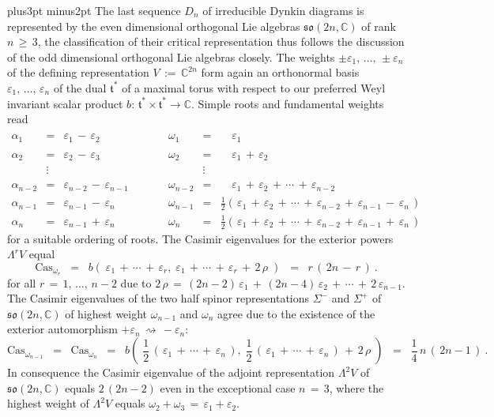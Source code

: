 \documentclass[12pt]{article}
\def\C{\mathbb{C}}
\def\Cas{\mathrm{Cas}}
\def\e{\varepsilon}
\def\L{\Lambda}
\def\pfill{\vskip6pt plus3pt minus2pt\noindent}
\def\so{\mathfrak{so}}
\def\t{\mathfrak{t}}
\def\Z{\Sigma}
\begin{document}
 \pfill
 The last sequence $D_n$ of irreducible Dynkin diagrams is represented
 by the even dimensional orthogonal Lie algebras $\so(2n,\C)$ of rank
 $n\,\geq\,3$, the classification of their critical representation thus
 follows the discussion of the odd dimensional orthogonal Lie algebras
 closely. The weights $\pm\e_1,\,\ldots,\,\pm\e_n$ of the defining
 representation $V\,:=\,\C^{2n}$ form again an orthonormal basis
 $\e_1,\,\ldots,\,\e_n$ of the dual $\t^*$ of a maximal torus with
 respect to our preferred Weyl invariant scalar product $b:\,\t^*\times
 \t^*\longrightarrow\C$. Simple roots and fundamental weights read
 $$
  \begin{array}{lclclcl}
   \alpha_1&=&\e_1\,-\,\e_2&\qquad&
   \omega_1&=&\phantom{\frac12(\,}\e_1
   \\
   \alpha_2&=&\e_2\,-\,\e_3&&
   \omega_2&=&\phantom{\frac12(\,}\e_1\,+\,\e_2
   \\
   &\vdots&&&&\vdots&
   \\
   \alpha_{n-2}&=&\e_{n-2}\,-\,\e_{n-1}&&
   \omega_{n-2}&=&\phantom{\frac12(\,}\e_1\,+\,\e_2\,+\,\cdots\,+\,\e_{n-2}
   \\
   \alpha_{n-1}&=&\e_{n-1}\,-\,\e_n&&
   \omega_{n-1}&=&\frac12(\,\e_1\,+\,\e_2\,+\,\cdots\,+\,\e_{n-2}
   \,+\,\e_{n-1}\,-\,\e_n\,)
   \\
   \alpha_n&=&\e_{n-1}\,+\,\e_n&&
   \omega_n&=&\frac12(\,\e_1\,+\,\e_2\,+\,\cdots\,+\,\e_{n-2}
   \,+\,\e_{n-1}\,+\,\e_n\,)
  \end{array}
 $$
 for a suitable ordering of roots. The Casimir eigenvalues for the exterior
 powers $\L^rV$ equal
 $$
  \Cas_{\omega_r}
  \;\;=\;\;
  b(\;\e_1\,+\,\cdots\,+\,\e_r,\;\e_1\,+\,\cdots\,+\,\e_r\,+\,2\,\rho\;)
  \;\;=\;\;
  r\,(\,2n\,-\,r\,)\ .
 $$
 for all $r\,=\,1,\,\ldots,\,n-2$ due to $2\,\rho\,=\,(2n-2)\,\e_1\,+\,
 (2n-4)\,\e_2\,+\,\cdots\,+\,2\,\e_{n-1}$. The Casimir eigenvalues of the
 two half spinor representations $\Z^-$ and $\Z^+$ of $\so(2n,\C)$ of highest
 weight $\omega_{n-1}$ and $\omega_n$ agree due to the existence of the
 exterior automorphism $+\e_n\,\rightsquigarrow\,-\e_n$:
 $$
  \Cas_{\omega_{n-1}}
  \;\;=\;\;
  \Cas_{\omega_n}
  \;\;=\;\;
  b(\;{\textstyle\frac12}\,(\,\e_1\,+\,\cdots\,+\,\e_n\,),\;
  {\textstyle\frac12}\,(\,\e_1\,+\,\cdots\,+\,\e_n\,)\,+\,2\,\rho\;)
  \;\;=\;\;
  {\textstyle\frac14}\,n\,(\,2n-1\,)\ .
 $$
 In consequence the Casimir eigenvalue of the adjoint representation $\L^2V$
 of $\so(2n,\C)$ equals $2\,(2n-2)$ even in the exceptional case $n\,=\,3$,
 where the highest weight of $\L^2V$ equals $\omega_2+\omega_3\,=\,\e_1+\e_2$.
\end{document}
